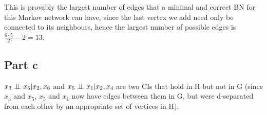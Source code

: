 This is provably the largest number of edges that a minimal and correct BN for this Markov network can have, since the last vertex we add need only be connected to its neighbours, hence the largest number of possible edges is $\frac{6\cdot 5}{2} - 2 = 13$.

\subsection{Part c}
$x_3 \perp\mkern-9.5mu\perp x_5 | x_2, x_6$ and $x_5 \perp\mkern-9.5mu\perp x_1 | x_2, x_4$ are two CIs that hold in H but not in G (since $x_3$ and $x_5$, $x_5$ and $x_1$ now have edges between them in G, but were d-separated from each other by an appropriate set of vertices in H).\\